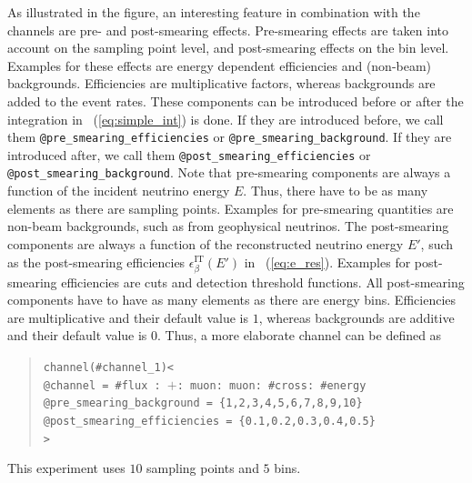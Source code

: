 As illustrated in the figure, an interesting feature in combination with the
channels are pre- and post-smearing effects. Pre-smearing effects are taken into account on the sampling point level, and post-smearing effects on the bin level. Examples for these effects are energy 
dependent efficiencies and (non-beam) backgrounds. Efficiencies are multiplicative factors, whereas backgrounds are added to the event rates. These components can be introduced before or after the integration in \eq~(\ref{eq:simple_int}) is done. 
%
%
If they are introduced before, 
we call them
{\tt @pre\_smearing\_efficiencies} or {\tt @pre\_smearing\_background}. 
If they are introduced after, we call them {\tt @post\_smearing\_efficiencies} or {\tt @post\_smearing\_background}.
Note that pre-smearing components are always a function of the incident neutrino energy $E$. Thus, there have to be as  many elements as there are sampling points. 
Examples for pre-smearing quantities are non-beam backgrounds, such as from geophysical neutrinos. The post-smearing components are always a function of the reconstructed neutrino energy $E'$, such as the post-smearing efficiencies $\epsilon_\beta^{\text{IT}}(E')$ in \eq~(\ref{eq:e_res}). Examples for post-smearing efficiencies are cuts and detection threshold functions. All post-smearing components have to have as 
many elements as there are energy bins. Efficiencies are multiplicative 
and their default value is $1$, whereas backgrounds are additive and their default value is $0$. Thus, a more elaborate channel can be defined as
\begin{quote}
{\tt channel(\#channel\_1)<\\
\tb @channel = \#flux : $+$: muon: muon: \#cross: \#energy\\
\tb @pre\_smearing\_background = \{1,2,3,4,5,6,7,8,9,10\}\\
\tb @post\_smearing\_efficiencies = \{0.1,0.2,0.3,0.4,0.5\}\\
>}
\end{quote}
%
%
This experiment uses $10$ sampling points and $5$ bins.

